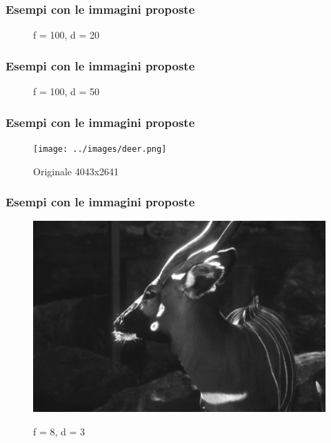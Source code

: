 \documentclass{beamer}
\begin{document}
\begin{frame}
	\frametitle{Esempi con le immagini proposte}
	\begin{figure}
		\caption{f = 100, d = 20}
	\end{figure}
\end{frame}

\begin{frame}
	\frametitle{Esempi con le immagini proposte}
	\begin{figure}
		\caption{f = 100, d = 50}
	\end{figure}
\end{frame}

\begin{frame}
	\frametitle{Esempi con le immagini proposte}
	\begin{figure}
		{\texttt{[image: ../images/deer.png]}}
		\caption{Originale 4043x2641}
	\end{figure}
\end{frame}

\begin{frame}
	\frametitle{Esempi con le immagini proposte}
	\begin{figure}
		{\includegraphics[width=.8\linewidth]{../images/deer-compressed-8-3.png}}
		\caption{f = 8, d = 3}
	\end{figure}
\end{frame}
\end{document}
